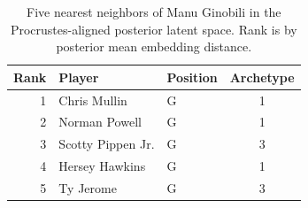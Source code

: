 \begin{table}[htbp]
  \centering\small
  \begin{tabular}{rllc}
    \toprule
    Rank & Player & Position & Archetype \\
    \midrule
    1 & Chris Mullin & G & 1 \\
    2 & Norman Powell & G & 1 \\
    3 & Scotty Pippen Jr. & G & 3 \\
    4 & Hersey Hawkins & G & 1 \\
    5 & Ty Jerome & G & 3 \\
    \bottomrule
  \end{tabular}
  \caption{Five nearest neighbors of Manu Ginobili in the Procrustes-aligned posterior latent space. Rank is by posterior mean embedding distance.}
  \label{tab:Manu_Ginobili_neighbors}
\end{table}

